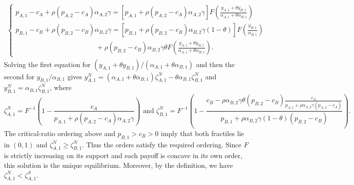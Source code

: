 \documentclass[nonblindrev,copyedit]{informs1}
\begin{document}
\begin{APPENDICES}
\begin{eqnarray} \label{modeln:eq1}
    \begin{cases}
        p_{A,1} - c_A + \rho (p_{A,2} -c_A)\alpha_{A,2} \gamma = [p_{A,1} + \rho (p_{A,2} -c_A)\alpha_{A,2}\gamma] F \left(\frac{y_{A,1} + \theta y_{B,1}}{\alpha_{A,1}+\theta \alpha_{B,1}} \right)
        \\
        p_{B,1} -c_B + \rho (p_{B,2} -c_B) \alpha_{B,2} \gamma =  [p_{B,1} + \rho (p_{B,2} -c_B)\alpha_{B,2} \gamma(1-\theta)] F\left(\frac{y_{B,1}}{\alpha_{B,1}} \right) \\
        \hspace{140pt} + \rho (p_{B,2} -c_B)\alpha_{B,2} \gamma \theta F \left(\frac{y_{A,1} + \theta y_{B,1}}{\alpha_{A,1}+\theta \alpha_{B,1}} \right).
    \end{cases}
\end{eqnarray}
Solving the first equation for $(y_{A,1}+\theta y_{B,1})/(\alpha_{A,1}+\theta\alpha_{B,1})$ and then the second for $y_{B,1}/\alpha_{B,1}$ gives $y^N_{A,1} = (\alpha_{A,1}+\theta \alpha_{B,1}) \zeta^N_{A,1} - \theta \alpha_{B,1} \zeta^N_{B,1}$ and $y^N_{B,1} = \alpha_{B,1} \zeta^N_{B,1}$, where
\begin{equation*} \label{modeln:zazb}
    \zeta^N_{A,1} = F^{-1}\left( 1 - \frac{c_A}{p_{A,1} + \rho (p_{A,2} -c_A)\alpha_{A,2} \gamma } \right) \text{ and } \zeta^N_{B,1} = F^{-1}\left( 1- \frac{c_B - \rho \alpha_{B,2} \gamma \theta (p_{B,2}-c_B)  \frac{c_A}{p_{A,1} + \rho \alpha_{A,2} \gamma (p_{A,2}-c_A)}}{p_{B,1} + \rho \alpha_{B,2} \gamma (1-\theta)(p_{B,2} -c_B)} \right).
\end{equation*}
The critical-ratio ordering above and $p_{B,1}>c_B>0$ imply that both fractiles lie in $(0,1)$ and $\zeta^N_{A,1}\geq\zeta^N_{B,1}$. Thus the orders satisfy the required ordering. Since $F$ is strictly increasing on its support and each payoff is concave in its own order, this solution is the unique equilibrium. Moreover, by the definition, we have $\zeta^N_{A,1} < \zeta^S_{A,1}$.


\end{APPENDICES}
\end{document}
